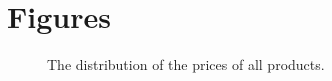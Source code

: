 \chapter{Figures}

\begin{figure}[H]
    \centering
    \caption{The distribution of the prices of all products.}
    \label{fig:price_all}
\end{figure}

